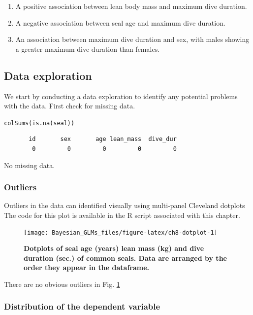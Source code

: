 \documentclass[
]{book}
\begin{document}
\begin{enumerate}
\def\labelenumi{\arabic{enumi}.}
\item
  A positive association between lean body mass and maximum dive duration.
\item
  A negative association between seal age and maximum dive duration.
\item
  An association between maximum dive duration and sex, with males showing a greater maximum dive duration than females.
\end{enumerate}

\hypertarget{gamma-eda}{%
\subsection{Data exploration}\label{gamma-eda}}

We start by conducting a data exploration to identify any potential problems with the data. First check for missing data.

\texttt{colSums(is.na(seal))}

\begin{verbatim}
       id       sex       age lean_mass  dive_dur 
        0         0         0         0         0 
\end{verbatim}

No missing data.

\hypertarget{outliers-2}{%
\subsubsection{Outliers}\label{outliers-2}}

Outliers in the data can identified visually using multi-panel Cleveland dotplots The code for this plot is available in the R script associated with this chapter.



\begin{figure}

{\centering \texttt{[image: Bayesian\_GLMs\_files/figure-latex/ch8-dotplot-1]} 

}

\caption{\textbf{Dotplots of seal age (years) lean mass (kg) and dive duration (sec.) of common seals. Data are arranged by the order they appear in the dataframe.}}\label{fig:ch8-dotplot}
\end{figure}

There are no obvious outliers in Fig. \ref{fig:ch8-dotplot}

\hypertarget{gamma-dist}{%
\subsubsection{Distribution of the dependent variable}\label{gamma-dist}}
\end{document}
